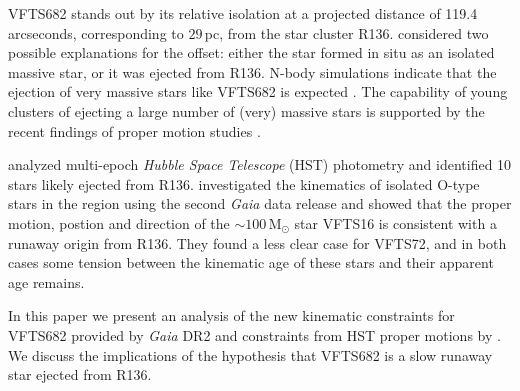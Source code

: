 \documentclass[a4paper,fleqn,usenatbib]{mnras}
\newcommand{\Msun}{{\,\mathrm{M}_\odot}}
\begin{document}
VFTS682 stands out by its relative isolation at a projected distance of 119.4 arcseconds, corresponding to 
$29$\,pc, from  the star cluster R136. \citet{bestenlehner:11}
considered two possible explanations for the offset: either
the star formed in situ as an isolated massive star, or it was ejected from  R136. N-body simulations 
indicate that the ejection of very massive stars like VFTS682 is
expected \citep[e.g.][]{fujii:11, banerjee:12}. The capability of
young clusters of ejecting a large number of (very) massive stars is supported by
the recent findings of proper motion studies \citep[e.g.,][]{lennon:18, drew:18}.

\citet{platais:15,platais:18} analyzed multi-epoch \emph{Hubble Space
  Telescope} (HST) photometry and identified 10 stars likely ejected
from R136. \citet{lennon:18} investigated the kinematics of  isolated
O-type stars in the region using the second \emph{Gaia} data release
\cite[DR2,][]{gaia:16,brown:18} and showed that the proper motion,
postion and direction of the $\sim$$100\Msun$ star VFTS16 is consistent
with a runaway origin from R136. They found a less clear case for
VFTS72, and in both cases some tension between the kinematic age of
these stars and their apparent age remains. 



In this paper we present an analysis of the new kinematic
constraints for VFTS682 provided by \emph{Gaia} DR2 and constraints
from HST proper motions  by \citet{platais:18}.   We discuss the
implications of the hypothesis that VFTS682 is a slow runaway star
ejected from R136.



\vspace*{-20pt}
\end{document}
